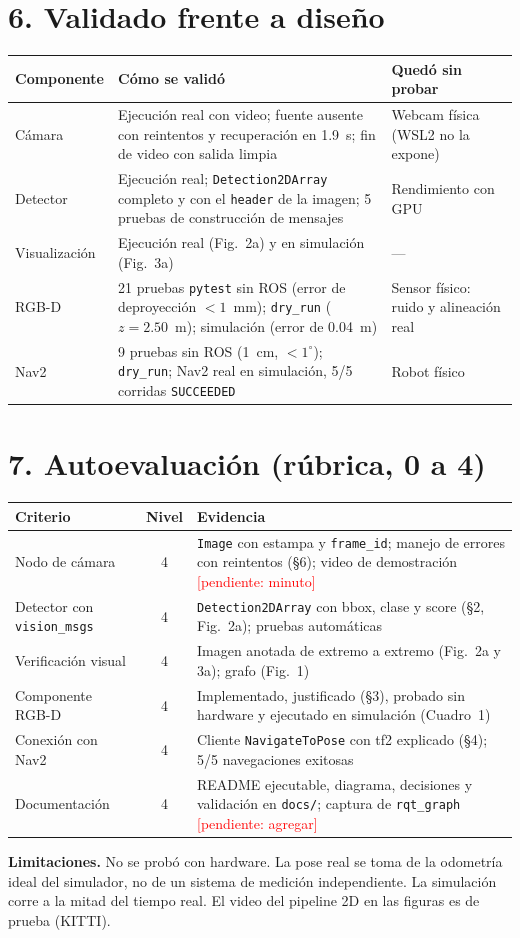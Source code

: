 \documentclass[9pt,letterpaper]{extarticle}
\newcommand{\code}[1]{\texttt{\small #1}}
\newcommand{\pendiente}[1]{\textcolor{red}{[pendiente: #1]}}
\begin{document}
\vspace{-8pt}
\section*{6. Validado frente a diseño}
\vspace{-2pt}
{\footnotesize
\begin{tabularx}{\linewidth}{@{}lXl@{}}
  \toprule
  Componente & Cómo se validó & Quedó sin probar \\
  \midrule
  Cámara & Ejecución real con video; fuente ausente con reintentos y recuperación en 1.9~s;
           fin de video con salida limpia & Webcam física (WSL2 no la expone) \\
  Detector & Ejecución real; \code{Detection2DArray} completo y con el \code{header} de la imagen;
             5 pruebas de construcción de mensajes & Rendimiento con GPU \\
  Visualización & Ejecución real (Fig.~2a) y en simulación (Fig.~3a) & --- \\
  RGB-D & 21 pruebas \code{pytest} sin ROS (error de deproyección $<1$~mm); \code{dry\_run}
          ($z=2.50$~m); simulación (error de 0.04~m) & Sensor físico: ruido y alineación real \\
  Nav2 & 9 pruebas sin ROS (1~cm, $<1^\circ$); \code{dry\_run}; Nav2 real en simulación, 5/5
         corridas \code{SUCCEEDED} & Robot físico \\
  \bottomrule
\end{tabularx}}

\section*{7. Autoevaluación (rúbrica, 0 a 4)}
\vspace{-2pt}
{\footnotesize
\begin{tabularx}{\linewidth}{@{}lcX@{}}
  \toprule
  Criterio & Nivel & Evidencia \\
  \midrule
  Nodo de cámara & 4 & \code{Image} con estampa y \code{frame\_id}; manejo de errores con
                       reintentos (§6); video de demostración \pendiente{minuto} \\
  Detector con \code{vision\_msgs} & 4 & \code{Detection2DArray} con bbox, clase y score (§2,
                       Fig.~2a); pruebas automáticas \\
  Verificación visual & 4 & Imagen anotada de extremo a extremo (Fig.~2a y 3a); grafo
                       (Fig.~1) \\
  Componente RGB-D & 4 & Implementado, justificado (§3), probado sin hardware y ejecutado en
                       simulación (Cuadro~1) \\
  Conexión con Nav2 & 4 & Cliente \code{NavigateToPose} con tf2 explicado (§4); 5/5 navegaciones
                       exitosas \\
  Documentación & 4 & README ejecutable, diagrama, decisiones y validación en \code{docs/};
                       captura de \code{rqt\_graph} \pendiente{agregar} \\
  \bottomrule
\end{tabularx}}

\vspace{2pt}
{\footnotesize\textbf{Limitaciones.} No se probó con hardware. La pose real se toma de la
odometría ideal del simulador, no de un sistema de medición independiente. La simulación corre
a la mitad del tiempo real. El video del pipeline 2D en las figuras es de prueba (KITTI).}
\end{document}
